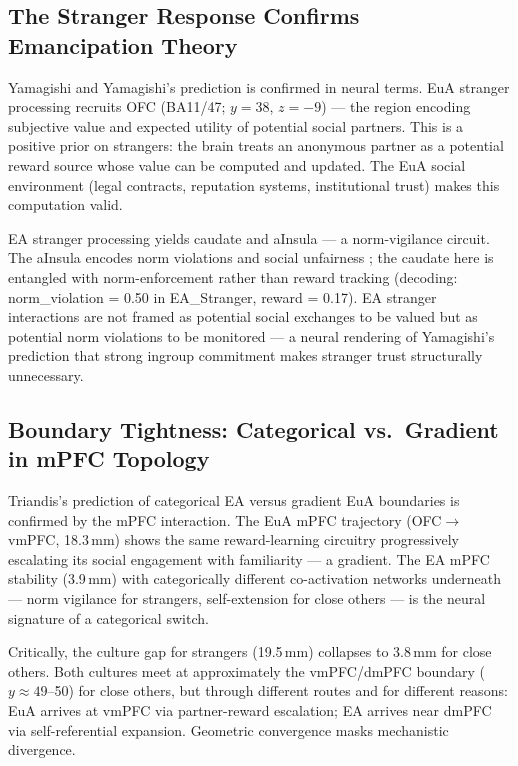\documentclass[11pt,a4paper]{article}
\begin{document}
\subsection{The Stranger Response Confirms Emancipation Theory}

Yamagishi and Yamagishi's \citeyear{Yamagishi1994} prediction is confirmed in neural terms.
EuA stranger processing recruits OFC (BA11/47; $y=38$, $z=-9$) — the region encoding subjective
value and expected utility of potential social partners. This is a positive prior on strangers:
the brain treats an anonymous partner as a potential reward source whose value can be computed
and updated. The EuA social environment (legal contracts, reputation systems, institutional
trust) makes this computation valid.

EA stranger processing yields caudate and aInsula — a norm-vigilance circuit. The aInsula
encodes norm violations and social unfairness \citep{Sanfey2003}; the caudate here is
entangled with norm-enforcement rather than reward tracking (decoding: norm\_violation = 0.50
in EA\_Stranger, reward = 0.17). EA stranger interactions are not framed as potential social
exchanges to be valued but as potential norm violations to be monitored — a neural rendering
of Yamagishi's prediction that strong ingroup commitment makes stranger trust structurally
unnecessary.

\subsection{Boundary Tightness: Categorical vs.\ Gradient in mPFC Topology}

Triandis's \citeyear{Triandis1995} prediction of categorical EA versus gradient EuA boundaries
is confirmed by the mPFC interaction. The EuA mPFC trajectory (OFC$\to$vmPFC, 18.3\,mm) shows
the same reward-learning circuitry progressively escalating its social engagement with
familiarity — a gradient. The EA mPFC stability (3.9\,mm) with categorically different
co-activation networks underneath — norm vigilance for strangers, self-extension for close
others — is the neural signature of a categorical switch.

Critically, the culture gap for strangers (19.5\,mm) collapses to 3.8\,mm for close others.
Both cultures meet at approximately the vmPFC/dmPFC boundary ($y\approx49$--50) for close
others, but through different routes and for different reasons: EuA arrives at vmPFC via
partner-reward escalation; EA arrives near dmPFC via self-referential expansion. Geometric
convergence masks mechanistic divergence.
\end{document}
